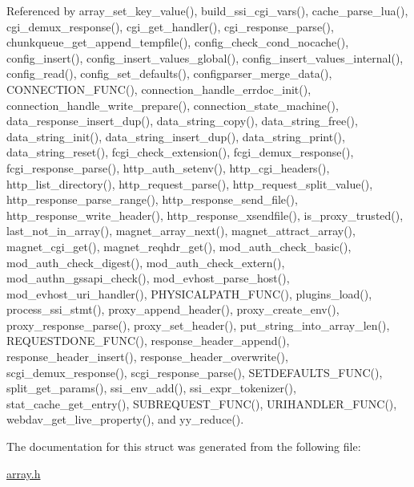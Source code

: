 Referenced by array\-\_\-set\-\_\-key\-\_\-value(), build\-\_\-ssi\-\_\-cgi\-\_\-vars(), cache\-\_\-parse\-\_\-lua(), cgi\-\_\-demux\-\_\-response(), cgi\-\_\-get\-\_\-handler(), cgi\-\_\-response\-\_\-parse(), chunkqueue\-\_\-get\-\_\-append\-\_\-tempfile(), config\-\_\-check\-\_\-cond\-\_\-nocache(), config\-\_\-insert(), config\-\_\-insert\-\_\-values\-\_\-global(), config\-\_\-insert\-\_\-values\-\_\-internal(), config\-\_\-read(), config\-\_\-set\-\_\-defaults(), configparser\-\_\-merge\-\_\-data(), C\-O\-N\-N\-E\-C\-T\-I\-O\-N\-\_\-\-F\-U\-N\-C(), connection\-\_\-handle\-\_\-errdoc\-\_\-init(), connection\-\_\-handle\-\_\-write\-\_\-prepare(), connection\-\_\-state\-\_\-machine(), data\-\_\-response\-\_\-insert\-\_\-dup(), data\-\_\-string\-\_\-copy(), data\-\_\-string\-\_\-free(), data\-\_\-string\-\_\-init(), data\-\_\-string\-\_\-insert\-\_\-dup(), data\-\_\-string\-\_\-print(), data\-\_\-string\-\_\-reset(), fcgi\-\_\-check\-\_\-extension(), fcgi\-\_\-demux\-\_\-response(), fcgi\-\_\-response\-\_\-parse(), http\-\_\-auth\-\_\-setenv(), http\-\_\-cgi\-\_\-headers(), http\-\_\-list\-\_\-directory(), http\-\_\-request\-\_\-parse(), http\-\_\-request\-\_\-split\-\_\-value(), http\-\_\-response\-\_\-parse\-\_\-range(), http\-\_\-response\-\_\-send\-\_\-file(), http\-\_\-response\-\_\-write\-\_\-header(), http\-\_\-response\-\_\-xsendfile(), is\-\_\-proxy\-\_\-trusted(), last\-\_\-not\-\_\-in\-\_\-array(), magnet\-\_\-array\-\_\-next(), magnet\-\_\-attract\-\_\-array(), magnet\-\_\-cgi\-\_\-get(), magnet\-\_\-reqhdr\-\_\-get(), mod\-\_\-auth\-\_\-check\-\_\-basic(), mod\-\_\-auth\-\_\-check\-\_\-digest(), mod\-\_\-auth\-\_\-check\-\_\-extern(), mod\-\_\-authn\-\_\-gssapi\-\_\-check(), mod\-\_\-evhost\-\_\-parse\-\_\-host(), mod\-\_\-evhost\-\_\-uri\-\_\-handler(), P\-H\-Y\-S\-I\-C\-A\-L\-P\-A\-T\-H\-\_\-\-F\-U\-N\-C(), plugins\-\_\-load(), process\-\_\-ssi\-\_\-stmt(), proxy\-\_\-append\-\_\-header(), proxy\-\_\-create\-\_\-env(), proxy\-\_\-response\-\_\-parse(), proxy\-\_\-set\-\_\-header(), put\-\_\-string\-\_\-into\-\_\-array\-\_\-len(), R\-E\-Q\-U\-E\-S\-T\-D\-O\-N\-E\-\_\-\-F\-U\-N\-C(), response\-\_\-header\-\_\-append(), response\-\_\-header\-\_\-insert(), response\-\_\-header\-\_\-overwrite(), scgi\-\_\-demux\-\_\-response(), scgi\-\_\-response\-\_\-parse(), S\-E\-T\-D\-E\-F\-A\-U\-L\-T\-S\-\_\-\-F\-U\-N\-C(), split\-\_\-get\-\_\-params(), ssi\-\_\-env\-\_\-add(), ssi\-\_\-expr\-\_\-tokenizer(), stat\-\_\-cache\-\_\-get\-\_\-entry(), S\-U\-B\-R\-E\-Q\-U\-E\-S\-T\-\_\-\-F\-U\-N\-C(), U\-R\-I\-H\-A\-N\-D\-L\-E\-R\-\_\-\-F\-U\-N\-C(), webdav\-\_\-get\-\_\-live\-\_\-property(), and yy\-\_\-reduce().



The documentation for this struct was generated from the following file\-:\begin{DoxyCompactItemize}
\item 
\hyperlink{array_8h}{array.\-h}\end{DoxyCompactItemize}
